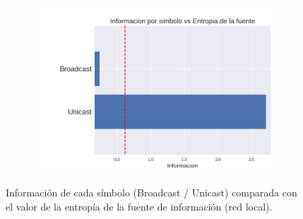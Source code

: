 \begin{figure}[h]
  \begin{subfigure}{.5\textwidth}
    \includegraphics[width=\textwidth]{imagenes/mini_red/mini_red_unicastvsbroadcast.png}
  \end{subfigure}
  \label{fig:exp3_univsbr_infovsentro}
  \caption{Información de cada símbolo (Broadcast / Unicast) comparada con el valor de la entropía de la fuente de información (red local).}
\end{figure}


